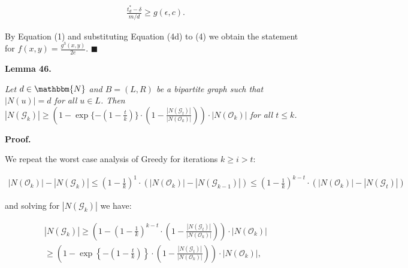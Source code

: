 \documentclass[10pt,a4paper]{article}
\begin{document}
\[\begin{gathered}
\displaystyle\frac{t^{*}_{d}-\delta}{m/d}\geq g(\epsilon,c).
\end{gathered}\]


By Equation (1) and substituting Equation (4d) to (4) we obtain the statement for $f(x,y)=\frac{g^{3}(x,y)}{2e}$.
\ensuremath{\blacksquare}\par






\par\medskip\noindent\textbf{\textbf{Lemma 46}\textbf{.}}\par



\emph{Let $d\in\mathbbm{N}$ and $B=(L,R)$ be a bipartite graph such that $|N(u)|=d$ for all $u\in L$.
Then $|N(\mathcal{G}_{k})|\geq\left(1-\exp\{-(1-\frac{t}{k})\}\cdot\left(1-\frac{|N(\mathcal{G}_{t})|}{|N(\mathcal{O}_{k})|}\right)\right)\cdot|N(\mathcal{O}_{k})|$ for all $t\leq k$.}\par






\par\medskip\noindent\textbf{Proof.}\par



We repeat the worst case analysis of Greedy for iterations $k\geq i>t$:\par


\[\begin{gathered}
\displaystyle|N(\mathcal{O}_{k})|-|N(\mathcal{G}_{k})|\leq\left(1-\frac{1}{k}\right)^{1}\cdot\left(|N(\mathcal{O}_{k})|-|N(\mathcal{G}_{k-1})|\right)\leq\left(1-\frac{1}{k}\right)^{k-t}\cdot\left(|N(\mathcal{O}_{k})|-|N(\mathcal{G}_{t})|\right)
\end{gathered}\]


and solving for $|N(\mathcal{G}_{k})|$ we have:\par


\[\begin{gathered}
\displaystyle|N(\mathcal{G}_{k})| \displaystyle\geq\left(1-\left(1-\frac{1}{k}\right)^{k-t}\cdot\left(1-\frac{|N(\mathcal{G}_{t})|}{|N(\mathcal{O}_{k})|}\right)\right)\cdot|N(\mathcal{O}_{k})| \\
\displaystyle\geq\left(1-\exp\left\{-\left(1-\frac{t}{k}\right)\right\}\cdot\left(1-\frac{|N(\mathcal{G}_{t})|}{|N(\mathcal{O}_{k})|}\right)\right)\cdot|N(\mathcal{O}_{k})|,
\end{gathered}\]
\end{document}
